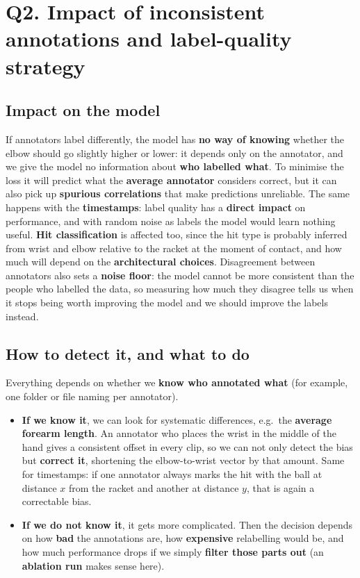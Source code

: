 \documentclass[11pt,a4paper]{article}
\begin{document}
\section*{Q2. Impact of inconsistent annotations and label-quality strategy}

\subsection*{Impact on the model}

If annotators label differently, the model has \textbf{no way of knowing} whether the elbow
should go slightly higher or lower: it depends only on the annotator, and we give the model
no information about \textbf{who labelled what}. To minimise the loss it will predict what
the \textbf{average annotator} considers correct, but it can also pick up \textbf{spurious
correlations} that make predictions unreliable. The same happens with the
\textbf{timestamps}: label quality has a \textbf{direct impact} on performance, and with
random noise as labels the model would learn nothing useful. \textbf{Hit classification} is
affected too, since the hit type is probably inferred from wrist and elbow relative to the
racket at the moment of contact, and how much will depend on the \textbf{architectural
choices}.
Disagreement between annotators also sets a \textbf{noise floor}: the model cannot be more
consistent than the people who labelled the data, so measuring how much they disagree tells us
when it stops being worth improving the model and we should improve the labels instead.

\subsection*{How to detect it, and what to do}

Everything depends on whether we \textbf{know who annotated what} (for example, one folder
or file naming per annotator).

\begin{itemize}
  \item \textbf{If we know it}, we can look for systematic differences, e.g.\ the
    \textbf{average forearm length}. An annotator who places the wrist in the middle of the
    hand gives a consistent offset in every clip, so we can not only detect the bias but
    \textbf{correct it}, shortening the elbow-to-wrist vector by that amount. Same for timestamps:
    if one annotator always marks the hit with the ball at distance $x$ from the racket and
    another at distance $y$, that is again a correctable bias.
  \item \textbf{If we do not know it}, it gets more complicated. Then the decision depends on
    how \textbf{bad} the annotations are, how \textbf{expensive} relabelling would be, and how
    much performance drops if we simply \textbf{filter those parts out} (an \textbf{ablation
    run} makes sense here).
\end{itemize}
\end{document}
